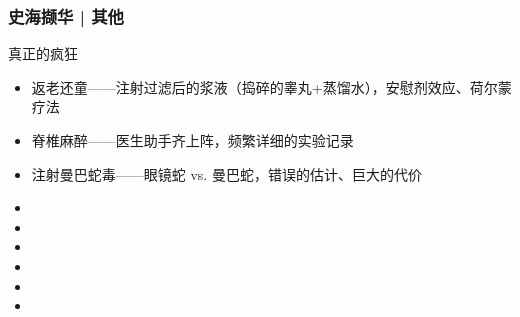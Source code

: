 % 
\begin{frame}
  \frametitle{史海撷华 | 其他}
  \begin{block}{真正的疯狂}
    \begin{itemize}
      \item 返老还童——注射过滤后的浆液（捣碎的睾丸+蒸馏水），安慰剂效应、荷尔蒙疗法
      \item 脊椎麻醉——医生助手齐上阵，频繁详细的实验记录
      \item 注射曼巴蛇毒——眼镜蛇 vs. 曼巴蛇，错误的估计、巨大的代价
      \item 
      \item 
      \item 
      \item 
      \item 
      \item 
    \end{itemize}
  \end{block}
\end{frame}



